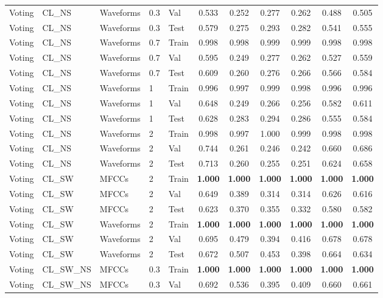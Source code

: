 \begin{landscape}
\begin{longtable}{|l|l|l|l|l|c|c|c|c|c|c|}
Voting & CL\_NS & Waveforms & 0.3 & Val & 0.533 & 0.252 & 0.277 & 0.262 & 0.488 & 0.505 \\
Voting & CL\_NS & Waveforms & 0.3 & Test & 0.579 & 0.275 & 0.293 & 0.282 & 0.541 & 0.555 \\
Voting & CL\_NS & Waveforms & 0.7 & Train & 0.998 & 0.998 & 0.999 & 0.999 & 0.998 & 0.998 \\
Voting & CL\_NS & Waveforms & 0.7 & Val & 0.595 & 0.249 & 0.277 & 0.262 & 0.527 & 0.559 \\
Voting & CL\_NS & Waveforms & 0.7 & Test & 0.609 & 0.260 & 0.276 & 0.266 & 0.566 & 0.584 \\
Voting & CL\_NS & Waveforms & 1 & Train & 0.996 & 0.997 & 0.999 & 0.998 & 0.996 & 0.996 \\
Voting & CL\_NS & Waveforms & 1 & Val & 0.648 & 0.249 & 0.266 & 0.256 & 0.582 & 0.611 \\
Voting & CL\_NS & Waveforms & 1 & Test & 0.628 & 0.283 & 0.294 & 0.286 & 0.555 & 0.584 \\
Voting & CL\_NS & Waveforms & 2 & Train & 0.998 & 0.997 & 1.000 & 0.999 & 0.998 & 0.998 \\
Voting & CL\_NS & Waveforms & 2 & Val & 0.744 & 0.261 & 0.246 & 0.242 & 0.660 & 0.686 \\
Voting & CL\_NS & Waveforms & 2 & Test & 0.713 & 0.260 & 0.255 & 0.251 & 0.624 & 0.658 \\
Voting & CL\_SW & MFCCs & 2 & Train & \textbf{1.000} & \textbf{1.000} & \textbf{1.000} & \textbf{1.000} & \textbf{1.000} & \textbf{1.000} \\
Voting & CL\_SW & MFCCs & 2 & Val & 0.649 & 0.389 & 0.314 & 0.314 & 0.626 & 0.616 \\
Voting & CL\_SW & MFCCs & 2 & Test & 0.623 & 0.370 & 0.355 & 0.332 & 0.580 & 0.582 \\
Voting & CL\_SW & Waveforms & 2 & Train & \textbf{1.000} & \textbf{1.000} & \textbf{1.000} & \textbf{1.000} & \textbf{1.000} & \textbf{1.000} \\
Voting & CL\_SW & Waveforms & 2 & Val & 0.695 & 0.479 & 0.394 & 0.416 & 0.678 & 0.678 \\
Voting & CL\_SW & Waveforms & 2 & Test & 0.672 & 0.507 & 0.453 & 0.398 & 0.664 & 0.634 \\
Voting & CL\_SW\_NS & MFCCs & 0.3 & Train & \textbf{1.000} & \textbf{1.000} & \textbf{1.000} & \textbf{1.000} & \textbf{1.000} & \textbf{1.000} \\
Voting & CL\_SW\_NS & MFCCs & 0.3 & Val & 0.692 & 0.536 & 0.395 & 0.409 & 0.660 & 0.661 \\

\end{longtable}
\end{landscape}
